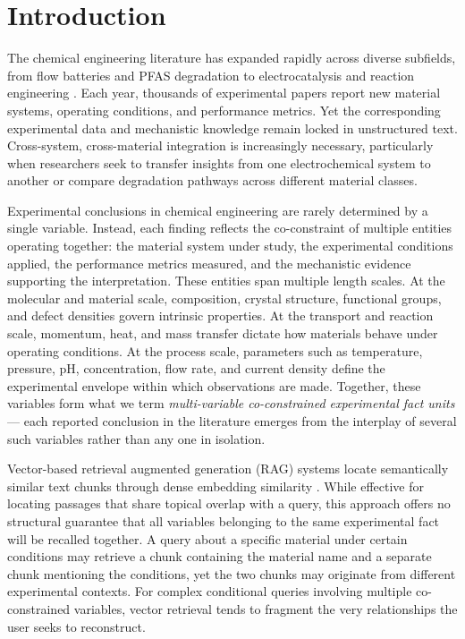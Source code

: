 \section{Introduction}

The chemical engineering literature has expanded rapidly across diverse subfields, from flow batteries and PFAS degradation to electrocatalysis and reaction engineering \cite{goodenough2013battery_knowledge,wang2021pfas}. Each year, thousands of experimental papers report new material systems, operating conditions, and performance metrics. Yet the corresponding experimental data and mechanistic knowledge remain locked in unstructured text. Cross-system, cross-material integration is increasingly necessary, particularly when researchers seek to transfer insights from one electrochemical system to another or compare degradation pathways across different material classes.

Experimental conclusions in chemical engineering are rarely determined by a single variable. Instead, each finding reflects the co-constraint of multiple entities operating together: the material system under study, the experimental conditions applied, the performance metrics measured, and the mechanistic evidence supporting the interpretation. These entities span multiple length scales. At the molecular and material scale, composition, crystal structure, functional groups, and defect densities govern intrinsic properties. At the transport and reaction scale, momentum, heat, and mass transfer dictate how materials behave under operating conditions. At the process scale, parameters such as temperature, pressure, pH, concentration, flow rate, and current density define the experimental envelope within which observations are made. Together, these variables form what we term \emph{multi-variable co-constrained experimental fact units} --- each reported conclusion in the literature emerges from the interplay of several such variables rather than any one in isolation.

Vector-based retrieval augmented generation (RAG) systems locate semantically similar text chunks through dense embedding similarity \cite{lewis2020rag}. While effective for locating passages that share topical overlap with a query, this approach offers no structural guarantee that all variables belonging to the same experimental fact will be recalled together. A query about a specific material under certain conditions may retrieve a chunk containing the material name and a separate chunk mentioning the conditions, yet the two chunks may originate from different experimental contexts. For complex conditional queries involving multiple co-constrained variables, vector retrieval tends to fragment the very relationships the user seeks to reconstruct.

